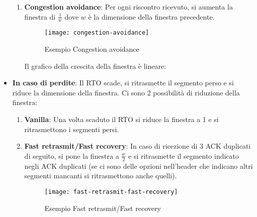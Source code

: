 \documentclass[a4paper]{article}
\begin{document}
\begin{itemize}
\begin{enumerate}
      \item \textbf{Congestion avoidance}: Per ogni riscontro ricevuto, si aumenta
        la finestra di \( \frac{1}{w} \) dove \( w \) è la dimensione della finestra
        precedente.
        \begin{figure}[H]
          \centering
          \texttt{[image: congestion-avoidance]}
          \caption{Esempio Congestion avoidance}
        \end{figure}

        \noindent
        Il grafico della crescita della finestra è lineare:
        \begin{figure}[H]
          \centering
        \end{figure}
    \end{enumerate}
  \item \textbf{In caso di perdite}: Il RTO scade, si ritrasmette il segmento perso
    e si riduce la dimensione della finestra. Ci sono 2 possibilità di riduzione della
    finestra:
    \begin{enumerate}
      \item \textbf{Vanilla}: Una volta scaduto il RTO si riduce la finestra a 1 e si 
        ritrasmettono i segmenti persi.

      \item \textbf{Fast retrasmit/Fast recovery}: In caso di ricezione di 3 ACK duplicati
        di seguito, si pone la finestra a \( \frac{w}{2} \) e si ritrasmette il segmento
        indicato negli ACK duplicati (se ci sono delle opzioni nell'header che indicano
        altri segmenti mancanti si ritrasmettono anche quelli).
        \begin{figure}[H]
          \centering
          \texttt{[image: fast-retrasmit-fast-recovery]}
          \caption{Esempio Fast retrasmit/Fast recovery}
        \end{figure}
    \end{enumerate}
\end{itemize}
\end{document}
